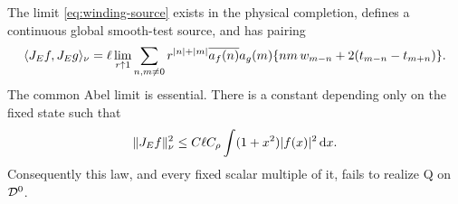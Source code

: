 \begin{theorem}
The limit \eqref{eq:winding-source} exists in the physical completion,
defines a continuous global smooth-test source, and has pairing
\begin{equation}\label{eq:electric-winding-pair}
\langle J_Ef,J_Eg\rangle_\nu
=\ell\lim_{r\uparrow1}\sum_{n,m\ne0}r^{|n|+|m|}
 \overline{a_f(n)}a_g(m)
 \{nm\,w_{m-n}+2(t_{m-n}-t_{m+n})\}.
\end{equation}
The common Abel limit is essential. There is a constant depending only
on the fixed state such that
\begin{equation}\label{eq:winding-local-bound}
\lVert J_Ef\rVert_\nu^2\le C\ell C_\rho\int(1+x^2)|f(x)|^2\,\mathrm d x.
\end{equation}
Consequently this law, and every fixed scalar multiple of it, fails to
realize Q on $\mathcal D^0$.
\end{theorem}
